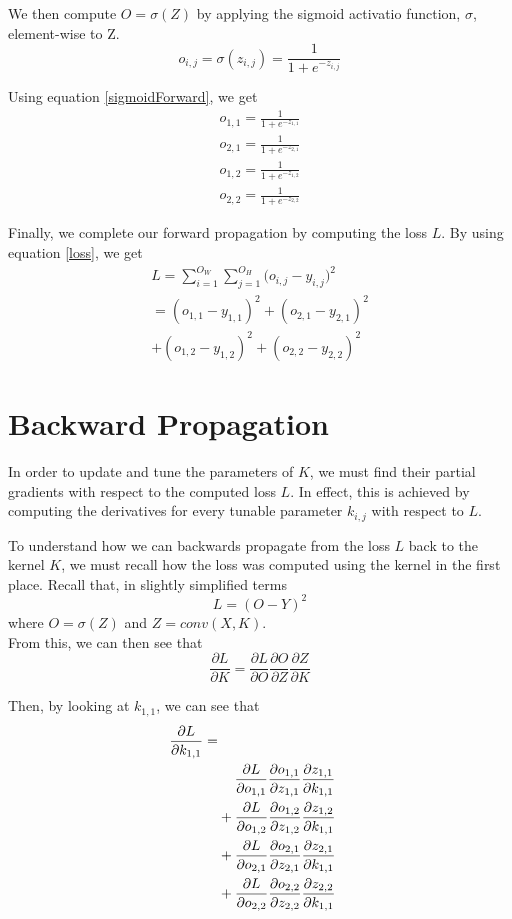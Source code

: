 \documentclass[english,notitlepage,reprint]{revtex4-1}
\begin{document}
We then compute $O=\sigma(Z)$ by applying the sigmoid activatio function, $\sigma$, element-wise to Z.
\begin{equation}\label{sigmoidForward}
  o_{i,j}=\sigma(z_{i,j})=\frac{1}{1+e^{-z_{i,j}}}
\end{equation}

Using equation \ref{sigmoidForward}, we get
\begin{align*}
  o_{1,1}=\frac{1}{1+e^{-z_{1,1}}}\\
  o_{2,1}=\frac{1}{1+e^{-z_{2,1}}}\\
  o_{1,2}=\frac{1}{1+e^{-z_{1,2}}}\\
  o_{2,2}=\frac{1}{1+e^{-z_{2,2}}}
\end{align*}

Finally, we complete our forward propagation by computing the loss $L$.
By using equation \ref{loss}, we get
\begin{align*}
  L=\sum_{i=1}^{O_W}{\sum_{j=1}^{O_H}{(o_{i,j}}-y_{i,j})^2}\\
  =(o_{1,1}-y_{1,1})^2+(o_{2,1}-y_{2,1})^2\\
  +(o_{1,2}-y_{1,2})^2+(o_{2,2}-y_{2,2})^2
\end{align*}

\section{Backward Propagation}
In order to update and tune the parameters of $K$, we must find their partial gradients with respect to the computed loss $L$.
In effect, this is achieved by computing the derivatives for every tunable parameter $k_{i,j}$ with respect to $L$.

To understand how we can backwards propagate from the loss $L$ back to the kernel $K$, we must recall how the loss was computed using the kernel in the first place.
Recall that, in slightly simplified terms
$$
  L=(O-Y)^2
$$
where $O=\sigma(Z)$ and $Z=conv(X,K)$.\\

From this, we can then see that
$$
  \frac{\partial L}{\partial K}=\frac{\partial L}{\partial O}\frac{\partial O}{\partial Z}\frac{\partial Z}{\partial K}
$$


Then, by looking at $k_{1,1}$, we can see that
\begin{equation}\notag
  \begin{split}
    \frac{\partial L}{\partial k_{1,1}}=\\
    &\hspace{12pt}\frac{\partial L}{\partial o_{1,1}}\frac{\partial o_{1,1}}{\partial z_{1,1}}\frac{\partial z_{1,1}}{\partial k_{1,1}}\\
    &+\frac{\partial L}{\partial o_{1,2}}\frac{\partial o_{1,2}}{\partial z_{1,2}}\frac{\partial z_{1,2}}{\partial k_{1,1}}\\
    &+\frac{\partial L}{\partial o_{2,1}}\frac{\partial o_{2,1}}{\partial z_{2,1}}\frac{\partial z_{2,1}}{\partial k_{1,1}}\\
    &+\frac{\partial L}{\partial o_{2,2}}\frac{\partial o_{2,2}}{\partial z_{2,2}}\frac{\partial z_{2,2}}{\partial k_{1,1}}
  \end{split}
\end{equation}
\end{document}
